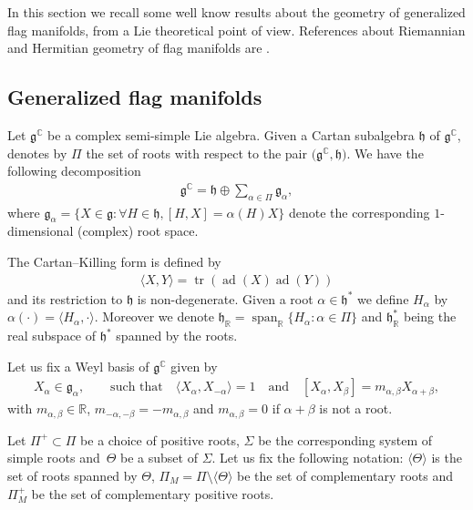 \documentclass[pdftex]{sigma}%
\numberwithin{equation}{section}
\DeclareMathOperator{\tr}{tr}
\DeclareMathOperator{\ad}{ad}
\DeclareMathOperator{\Span}{span}
\begin{document}
In this section we recall some well know results about the geometry of generalized flag manifolds, from a Lie theoretical point of view. References about Riemannian and Hermitian geometry of flag manifolds are \cite{alek-flag,grego, besse,rita, sn}.
\subsection{Generalized flag manifolds}
Let $\mathfrak{g}^\mathbb{C}$ be a complex semi-simple Lie algebra. Given a Cartan subalgebra $\mathfrak{h}$ of $\mathfrak{g}^\mathbb{C}$, denotes by $\Pi$ the set of roots with respect to the pair $\big(\mathfrak{g}^\mathbb{C},\mathfrak{h}\big)$. We have the following decomposition
\begin{gather*}
\mathfrak{g}^\mathbb{C}=\mathfrak{h}\oplus\sum_{\alpha\in \Pi}\mathfrak{g}_{\alpha},
\end{gather*}
where $\mathfrak{g}_{\alpha}=\{X\in\mathfrak{g}\colon \forall H\in \mathfrak{h},[H,X]=\alpha(H)X \}$ denote the corresponding $1$-dimensional (complex) root space.

The Cartan--Killing form is defined by
\begin{gather*}
\langle X,Y\rangle=\tr(\ad(X)\ad(Y))
\end{gather*}
and its restriction to $\mathfrak{h}$ is non-degenerate. Given a root $\alpha\in \mathfrak{h}^{*}$ we define $H_{\alpha}$ by $\alpha(\cdot)=\langle H_{\alpha},\cdot\rangle$. Moreover we denote $\mathfrak{h}_{\mathbb{R}}=\Span_{\mathbb{R}}\{H_{\alpha}\colon \alpha\in \Pi\}$ and $\mathfrak{h}_{\mathbb{R}}^{*}$ being the real subspace of $\mathfrak{h}^{*}$ spanned by the roots.

Let us fix a Weyl basis of $\mathfrak{g}^\mathbb{C}$ given by
\begin{gather*}
X_{\alpha}\in\mathfrak{g}_{\alpha}, \qquad \text{such that} \quad
\langle X_{\alpha},X_{-\alpha}\rangle=1 \quad \text{and} \quad [X_{\alpha},X_{\beta}]=m_{\alpha,\beta}X_{\alpha+\beta},
\end{gather*}
with $m_{\alpha,\beta}\in\mathbb{R}$, $m_{-\alpha,-\beta}=-m_{\alpha,\beta}$ and $m_{\alpha,\beta}=0$ if $\alpha+\beta$ is not a root.

Let $\Pi^{+}\subset \Pi$ be a choice of positive roots, $\Sigma$ be the corresponding system of simple roots and~$\Theta$ be a subset of $\Sigma$. Let us fix the following notation: $\langle\Theta\rangle$ is the set of roots spanned by $\Theta$, $\Pi_{M}=\Pi\setminus\langle{\Theta}\rangle$ be the set of complementary roots and $\Pi_{M}^{+}$ be the set of complementary positive roots.
\end{document}
